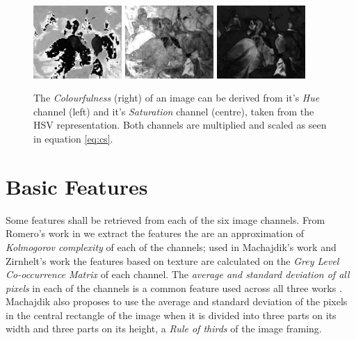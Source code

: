 \documentclass[11pt,a4paper,twoside,openright,draft]{report}
\begin{document}
\begin{multicols}{2}
\begin{figure}[tbp]
\centering
\includegraphics[width=0.30\textwidth]{H_caravaggio_1962_139_1}
\includegraphics[width=0.30\textwidth]{SHSV_caravaggio_1962_139_1}
\includegraphics[width=0.30\textwidth]{CS_caravaggio_1962_139_1}
\caption[Colourfulness]{The \emph{Colourfulness} (right) of an image can be
derived from it's \emph{Hue} channel (left) and it's \emph{Saturation} channel
(centre), taken from the HSV representation.  Both channels are multiplied and
scaled as seen in equation \ref{eq:cs}.}
\label{fig:cs}
\end{figure}

\section{Basic Features}

Some features shall be retrieved from each of the six image channels.  From
Romero's work in \cite{rmc12ajs} we extract the features the are an
approximation of \emph{Kolmogorov complexity} of each of the channels; used in
Machajdik's work \cite{mach10clas} and Zirnhelt's work \cite{zirnhelt07art} the
features based on texture are calculated on the \emph{Grey Level Co-occurrence
Matrix} of each channel.  The \emph{average and standard deviation of all
pixels} in each of the channels is a common feature used across all three works
\cite{jma12clas,zirnhelt07art,mach10clas}.  Machajdik \cite{mach10clas} also
proposes to use the average and standard deviation of the pixels in the central
rectangle of the image when it is divided into three parts on its width and
three parts on its height, a \emph{Rule of thirds} of the image framing.


\end{multicols}
\end{document}
